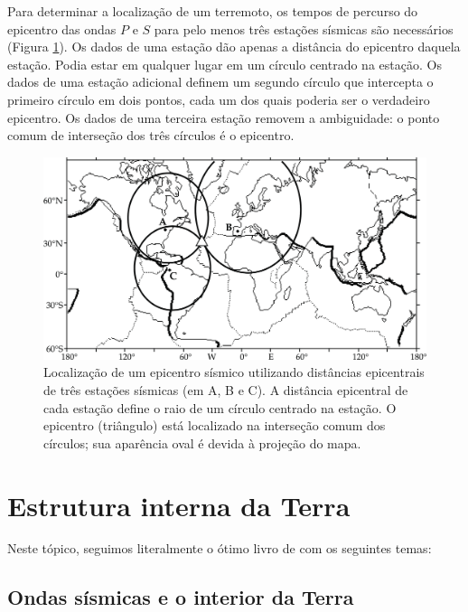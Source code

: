 \documentclass[]{book}
\theoremstyle{definition}
\theoremstyle{definition}
\theoremstyle{definition}
\theoremstyle{remark}
\begin{document}
Para determinar a localização de um terremoto, os tempos de percurso do epicentro das ondas \(P\) e \(S\) para pelo menos três estações sísmicas são necessários (Figura \ref{fig:terremoto}). Os dados de uma estação dão apenas a distância do epicentro daquela estação. Podia estar em qualquer lugar em um círculo centrado na estação. Os dados de uma estação adicional definem um segundo círculo que intercepta o primeiro círculo em dois pontos, cada um dos quais poderia ser o verdadeiro epicentro. Os dados de uma terceira estação removem a ambiguidade: o ponto comum de interseção dos três círculos é o epicentro.

\begin{figure}

{\centering \includegraphics[width=0.8\linewidth]{fig/Fig_03.18} 

}

\caption{Localização de um epicentro sísmico utilizando distâncias epicentrais de três estações sísmicas (em A, B e C). A distância epicentral de cada estação define o raio de um círculo centrado na estação. O epicentro (triângulo) está localizado na interseção comum dos círculos; sua aparência oval é devida à projeção do mapa.}\label{fig:terremoto}
\end{figure}

\hypertarget{estrutura-interna-da-terra}{%
\section{Estrutura interna da Terra}\label{estrutura-interna-da-terra}}

Neste tópico, seguimos literalmente o ótimo livro de \citet{Ribeiro2018} com os seguintes temas:

\hypertarget{ondas-sismicas-e-o-interior-da-terra}{%
\subsection{Ondas sísmicas e o interior da Terra}\label{ondas-sismicas-e-o-interior-da-terra}}
\end{document}
